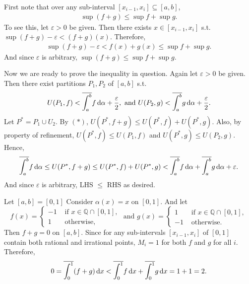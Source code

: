 \documentclass[12pt]{article}
\begin{document}
\begin{fproof}[1(b)]
    First note that over any sub-interval \([x_{i-1},x_i] \subseteq [a,b]\), 
    \begin{align*}
        \sup (f+g) \leq \sup f + \sup g. \tag{\(\ast\)}
    \end{align*}
    To see this, let \(\varepsilon > 0\) be given.
    Then there exists \(x \in [x_{i-1}, x_i]\) s.t. \(\sup(f + g) - \varepsilon < (f+g)(x)\).
    Therefore,
    \begin{align*}
        \sup(f + g) - \varepsilon < f(x) + g(x) \leq \sup f + \sup g.
    \end{align*}
    And since \(\varepsilon\) is arbitrary, \(\sup(f+g) \leq \sup f + \sup g\).

    Now we are ready to prove the inequality in question.
    Again let \(\varepsilon > 0\) be given. 
    Then there exist partitions \(P_1, P_2\) of \([a,b]\) s.t.
    \begin{align*}
        U(P_1, f) < \overline{\int_{a}^{b}} f \mathop{}\!\mathrm{d}\alpha + \frac{\varepsilon}{2}, \text{ and } U(P_2, g) < \overline{\int_{a}^{b}} g \mathop{}\!\mathrm{d}\alpha + \frac{\varepsilon}{2}. 
    \end{align*}
    Let \(P^* = P_1 \cup U_2\).
    By \((\ast)\), \(U(P^*, f+g) \leq U(P^*, f) + U(P^*, g)\).
    Also, by property of refinement, \(U(P^*,f) \leq U(P_1, f)\) and \(U(P^*, g) \leq U(P_2, g)\).
    Hence,
    \begin{align*}
        \overline{\int_{a}^{b}} f \mathop{}\!\mathrm{d}\alpha \leq U(P^*, f+g) \leq U(P^*,f) + U(P^*,g) < \overline{\int_{a}^{b}} f \mathop{}\!\mathrm{d}\alpha + \overline{\int_{a}^{b}} g \mathop{}\!\mathrm{d}\alpha + \varepsilon.
    \end{align*}
    And since \(\varepsilon\) is arbitrary, LHS \(\leq\) RHS as desired.

\end{fproof}

\begin{fproof}[1(c)]
    Let \([a,b] = [0,1]\)
    Consider \(\alpha(x) = x\) on \([0,1]\). And let
    \[
    f(x) = \begin{cases}
        -1 &\text{ if } x \in \mathbb{Q} \cap [0,1],\\
        1 &\text{ otherwise,}
    \end{cases}
    \text{ and }
    g(x) = \begin{cases}
        1 &\text{ if } x \in \mathbb{Q} \cap [0,1],\\
        -1 &\text{ otherwise.}
    \end{cases}
    \]
    Then \(f+g = 0\) on \([a,b]\).
    Since for any sub-intervals \([x_{i-1}, x_i]\) of \([0,1]\) contain both rational and irrational points, \(M_i = 1\) for both \(f\) and \(g\) for all \(i\).
    Therefore, 
    \begin{align*}
        0 = \overline{\int_{0}^{1}}(f+g) \mathop{}\!\mathrm{d} x < \overline{\int_{0}^{1}} f \mathop{}\!\mathrm{d} x + \overline{\int_{0}^{1}} g \mathop{}\!\mathrm{d} x = 1 + 1 = 2.
    \end{align*}
\end{fproof}
\newpage
\end{document}
